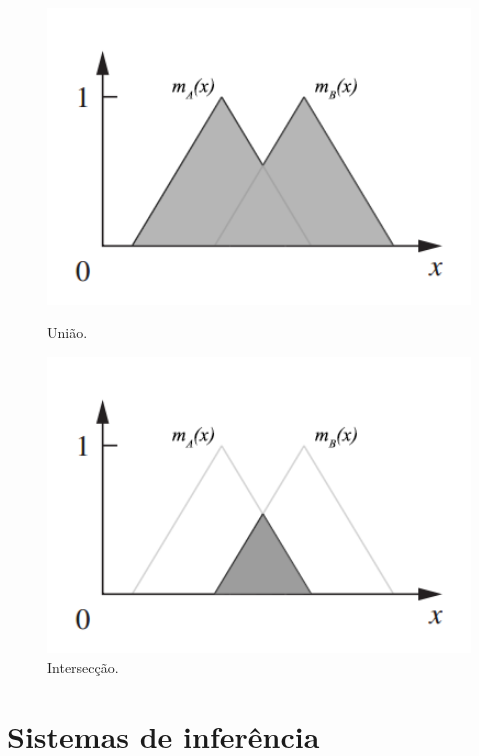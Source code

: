 \documentclass[12pt]{article}
\begin{document}
\begin{figure}
    \centering
    \begin{minipage}{0.45\textwidth}
        \centering
        \includegraphics[width=1.1\textwidth]{union.png}
        \caption{União.}
        \label{fig:union}
    \end{minipage}\hfill
    \begin{minipage}{0.45\textwidth}
        \centering
        \includegraphics[width=1.1\textwidth]{intersection.png}
        \caption{Intersecção.}
        \label{fig:intersection}
    \end{minipage}
\end{figure}

\section{Sistemas de inferência} \label{sec:inference}
\end{document}
